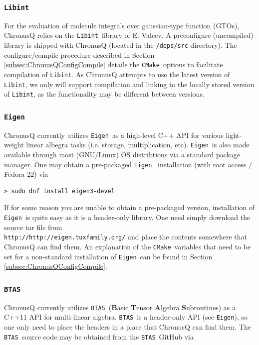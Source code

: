 \documentclass[12pt]{article}
\newcommand{\CMake}{\texttt{CMake}}
\newcommand{\Libint}{\texttt{Libint}}
\newcommand{\Eigen}{\texttt{Eigen}}
\newcommand{\BTAS}{\texttt{BTAS}}
\begin{document}
      \subsubsection{\Libint} \label{subsubsec:Libint}
        For the evaluation of molecule integrals over gaussian-type
        function (GTOs), ChronusQ relies on the \Libint~library of E. Valeev. A
	preconfigure (uncompiled) library is shipped with ChronusQ (located in
	the \texttt{/deps/src} directory). The configure/compile procedure
	described in Section \ref{subsec:ChronusQConfigCompile} details the
	\CMake~options to facilitate compilation of \Libint. As ChronusQ attempts
	to use the latest version of \Libint, we only will support compilation
	and linking to the locally stored version of \Libint, as the functionality
	may be different between versions.

      \subsubsection{\Eigen} \label{subsubsec:Eigen}
        ChronusQ currently utilizes \Eigen~as a high-level C++ API for
        various light-weight linear albegra tasks (i.e. storage, multiplication,
	etc). \Eigen~is also made available through most (GNU/Linux) OS distribtions
	via a standard package manager. One may obtain a pre-packaged \Eigen~
	installation (with root access / Fedora 22) via

	\begin{lstlisting}
> sudo dnf install eigen3-devel
	\end{lstlisting}

        \noindent If for some reason you are unable to obtain a pre-packaged 
	version, installation of \Eigen~is quite easy as it is a header-only 
	library. One need simply download the source tar file from \\
	\texttt{http://http://eigen.tuxfamily.org/} and place the contents 
	somewhere that ChronusQ can find them. An explanation of the 
	\CMake~variables that need to be set for a non-standard installation 
	of \Eigen~can be found
	in Section \ref{subsec:ChronusQConfigCompile}.

      \subsubsection{\BTAS} \label{subsubsec:BTAS}
        ChronusQ currently utilizes \BTAS~(\textbf{B}asic \textbf{T}ensor
        \textbf{A}lgebra \textbf{S}ubroutines) as a C++11 API for multi-linear 
	algebra. \BTAS~is a header-only API (see \Eigen), so one only need to place
	the headers in a place that ChronusQ can find them. The \BTAS~source code
	may be obtained from the \BTAS~GitHub via
\end{document}
